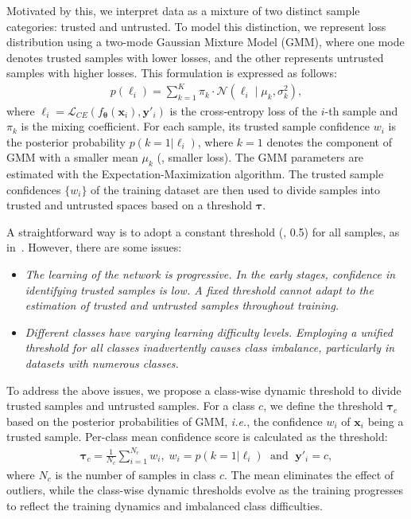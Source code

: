Motivated by this, we interpret data as a mixture of two distinct sample categories: trusted and untrusted. 
To model this distinction, we represent loss distribution using a two-mode Gaussian Mixture Model (GMM), where one mode denotes trusted samples with lower losses, and the other represents untrusted samples with higher losses. 
This formulation is expressed as follows:
\begin{equation}
\begin{aligned}
p(\ell_i) = \sum_{k=1}^{K} \pi_k \cdot \mathcal{N}(\ell_i \mid \mu_k, \sigma_k^2),
\end{aligned}
\label{eq4}
\end{equation}
where $\ell_i= \mathcal{L}_{CE}(f_{\boldsymbol{\theta}}(\bm{x}_i), \bm{y}'_i)$ is the cross-entropy loss of the $i$-th sample and $\pi_k$ is the mixing coefficient.
For each sample, its trusted sample confidence $w_i$ is the posterior probability $p(k=1|\ell_i)$, where $k=1$ denotes the component of GMM with a smaller mean $\mu_k$ (\ie, smaller loss).
The GMM parameters are estimated with the Expectation-Maximization algorithm.
The trusted sample confidences $\{ w_i \}$ of the training dataset are then used to divide samples into trusted and untrusted spaces based on a threshold $\bm{\tau}$. 


A straightforward way is to adopt a constant threshold (\eg, 0.5) for all samples, as in~\cite{arazo2019unsupervised, li2020dividemix, yang2022learning, zheltonozhskii2022contrast}. 
However, there are some issues: 
\begin{itemize} 
    \item \emph{
            The learning of the network is progressive. 
            In the early stages, confidence in identifying trusted samples is low.
            A fixed threshold cannot adapt to the estimation of trusted and untrusted samples throughout training.
    }
    \item \emph{
            Different classes have varying learning difficulty levels.
            Employing a unified threshold for all classes inadvertently causes class imbalance, particularly in datasets with numerous classes.
            }
\end{itemize}
To address the above issues, we propose a class-wise dynamic threshold to divide trusted samples and untrusted samples.
For a class $c$, we define the threshold $\bm{\tau}_c$ based on the posterior probabilities of GMM, \emph{i.e.}, the confidence $w_i$ of $\boldsymbol{x}_i$ being a trusted sample. 
Per-class mean confidence score is calculated as the threshold:
\begin{equation}
\begin{aligned}
\bm{\tau}_c = \frac{1}{N_c} \sum_{i=1}^{N_c} w_i, \; w_i = p(k=1|\ell_i) \; \text{ and } \; \bm{y}'_i = c,
\end{aligned}
\label{eq5}
\end{equation}
where $N_c$ is the number of samples in class $c$. 
The mean eliminates the effect of outliers, while the class-wise dynamic thresholds evolve as the training progresses to reflect the training dynamics and imbalanced class difficulties. 


